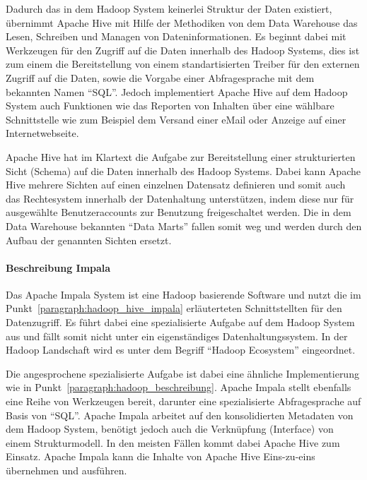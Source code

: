 Dadurch das in dem Hadoop System keinerlei Struktur der Daten existiert,
übernimmt Apache Hive mit Hilfe der Methodiken von dem Data Warehouse das
Lesen, Schreiben und Managen von Dateninformationen. Es beginnt dabei mit
Werkzeugen für den Zugriff auf die Daten innerhalb des Hadoop Systems, dies
ist zum einem die Bereitstellung von einem standartisierten Treiber für den
externen Zugriff auf die Daten, sowie die Vorgabe einer Abfragesprache mit dem
bekannten Namen ``SQL''. Jedoch implementiert Apache Hive auf dem Hadoop System
auch Funktionen wie das Reporten von Inhalten über eine wählbare Schnittstelle
wie zum Beispiel dem Versand einer eMail oder Anzeige auf einer
Internetwebseite.

Apache Hive hat im Klartext die Aufgabe zur Bereitstellung einer strukturierten
Sicht (Schema) auf die Daten innerhalb des Hadoop Systems. Dabei kann Apache
Hive mehrere Sichten auf einen einzelnen Datensatz definieren und somit auch
das  Rechtesystem innerhalb der Datenhaltung unterstützen, indem diese nur
für ausgewählte Benutzeraccounts zur Benutzung freigeschaltet werden. Die in
dem Data Warehouse bekannten ``Data Marts'' fallen somit weg und werden durch
den Aufbau der genannten Sichten ersetzt.
\nl%

\paragraph{Beschreibung Impala}
\label{paragraph:impala_beschreibung}
Das Apache Impala System ist eine Hadoop basierende Software und nutzt die
im Punkt~\ref{paragraph:hadoop_hive_impala} erläuterteten Schnittstellten
für den Datenzugriff. Es führt dabei eine spezialisierte Aufgabe auf dem
Hadoop System aus und fällt somit nicht unter ein eigenständiges
Datenhaltungssystem. In der Hadoop Landschaft wird es unter dem Begriff
``Hadoop Ecosystem'' eingeordnet.

Die angesprochene spezialisierte Aufgabe ist dabei eine ähnliche
Implementierung wie in Punkt~\ref{paragraph:hadoop_beschreibung}. Apache Impala
stellt ebenfalls eine Reihe von Werkzeugen bereit, darunter eine spezialisierte
Abfragesprache auf Basis von ``SQL''. Apache Impala arbeitet auf den
konsolidierten Metadaten von dem Hadoop System, benötigt jedoch auch die
Verknüpfung (Interface) von einem Strukturmodell. In den meisten Fällen
kommt dabei Apache Hive zum Einsatz. Apache Impala kann die Inhalte von
Apache Hive Eins-zu-eins übernehmen und ausführen.

